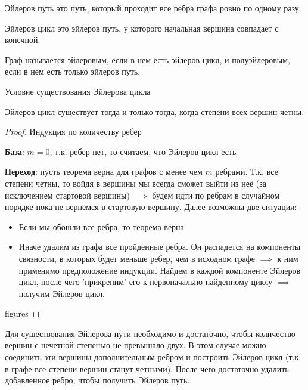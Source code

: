 
\begin{definition}
  Эйлеров путь это путь, который проходит все ребра графа ровно по одному разу.
\end{definition}

\begin{definition}
  Эйлеров цикл это эйлеров путь, у которого начальная вершина совпадает с
  конечной.
\end{definition}

\begin{definition}
  Граф называется эйлеровым, если в нем есть эйлеров цикл, и полуэйлеровым, если
  в нем есть только эйлеров путь.
\end{definition}

\begin{theorem}
  Условие существования Эйлерова цикла

  Эйлеров цикл существует тогда и только тогда, когда степени всех вершин четны.  
\end{theorem}
\begin{proof}
  Индукция по количеству ребер

  \textbf{База}: \(m = 0\), т.к. ребер нет, то считаем, что Эйлеров цикл есть

  \textbf{Переход}: пусть теорема верна для графов с менее чем \(m\) ребрами.
  Т.к. все степени четны, то войдя в вершины мы всегда сможет выйти из неё (за
  исключением стартовой вершины) \(\implies\) будем идти по ребрам в случайном
  порядке пока не вернемся в стартовую вершину. Далее возможны две ситуации:

  \begin{itemize}
    \item Если мы обошли все ребра, то теорема верна
    \item Иначе удалим из графа все пройденные ребра. Он распадется на
    компоненты связности, в которых будет меньше ребер, чем в исходном графе
    \(\implies\) к ним применимо предположение индукции. Найдем в каждой
    компоненте Эйлеров цикл, после чего 'прикрепим' его к первоначально
    найденному циклу \(\implies\) получим Эйлеров цикл.
  \end{itemize}

  \todo figures
\end{proof}

\begin{remark}
  Для существования Эйлерова пути необходимо и достаточно, чтобы количество
  вершин с нечетной степенью не превышало двух. В этом случае можно соединить
  эти вершины дополнительным ребром и построить Эйлеров цикл (т.к. в графе все
  степени вершин станут четными). После чего достаточно удалить добавленное
  ребро, чтобы получить Эйлеров путь.
\end{remark}
